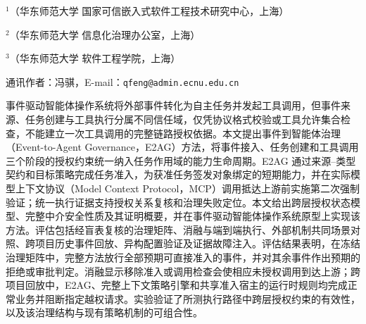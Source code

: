 \thispagestyle{josfirst}


\vspace{7pt}

\vspace{4pt}
\begingroup\fontsize{8pt}{12pt}\selectfont
\noindent$^{1}$（华东师范大学 国家可信嵌入式软件工程技术研究中心，上海）\par
\noindent$^{2}$（华东师范大学 信息化治理办公室，上海）\par
\noindent$^{3}$（华东师范大学 软件工程学院，上海）\par
\noindent 通讯作者：冯骐，E-mail：\texttt{qfeng@admin.ecnu.edu.cn}\par
\endgroup

\begin{joszhabstract}
事件驱动智能体操作系统将外部事件转化为自主任务并发起工具调用，但事件来源、任务创建与工具执行分属不同信任域，仅凭协议格式校验或工具允许集合检查，不能建立一次工具调用的完整链路授权依据。本文提出事件到智能体治理（Event-to-Agent Governance，E2AG）方法，将事件接入、任务创建和工具调用三个阶段的授权约束统一纳入任务作用域的能力生命周期。E2AG 通过来源--类型契约和目标策略完成任务准入，为获准任务签发对象绑定的短期能力，并在实际模型上下文协议（Model Context Protocol，MCP）调用抵达上游前实施第二次强制验证；统一执行证据支持授权关系复核和治理失败定位。本文给出跨层授权状态模型、完整中介安全性质及其证明概要，并在事件驱动智能体操作系统原型上实现该方法。评估包括经盲表复核的治理矩阵、消融与端到端执行、外部机制共同场景对照、跨项目历史事件回放、异构配置验证及证据故障注入。评估结果表明，在冻结治理矩阵中，完整方法放行全部预期可直接准入的事件，并对其余事件作出预期的拒绝或审批判定。消融显示移除准入或调用检查会使相应未授权调用到达上游；跨项目回放中，E2AG、完整上下文策略引擎和共享准入宿主的运行时规则均完成正常业务并阻断指定越权请求。实验验证了所测执行路径中跨层授权约束的有效性，以及该治理结构与现有策略机制的可组合性。
\end{joszhabstract}

